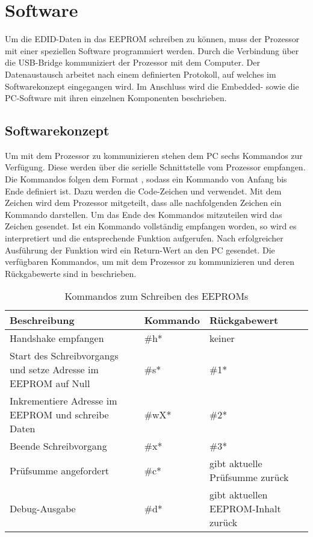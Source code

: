 \section{Software}
\label{sec:TeilB_Software}
Um die EDID-Daten in das EEPROM schreiben zu können, muss der Prozessor mit einer speziellen Software programmiert werden. Durch die Verbindung über die USB-Bridge kommuniziert der Prozessor mit dem Computer. Der Datenaustausch arbeitet nach einem definierten Protokoll, auf welches im Softwarekonzept eingegangen wird. Im Anschluss wird die Embedded- sowie die PC-Software mit ihren einzelnen Komponenten beschrieben. 
\subsection{Softwarekonzept}
\label{softwarekonzept}
Um mit dem Prozessor zu kommunizieren stehen dem PC sechs Kommandos zur Verfügung. Diese werden über die serielle Schnittstelle vom Prozessor empfangen. Die Kommandos folgen dem Format , sodass ein Kommando von Anfang bis Ende definiert ist. Dazu werden die Code-Zeichen \code{\#} und \code{\*} verwendet. Mit dem Zeichen \code{\#} wird dem Prozessor mitgeteilt, dass alle nachfolgenden Zeichen ein Kommando darstellen. Um das Ende des Kommandos mitzuteilen wird das Zeichen \code{\*} gesendet. Ist ein Kommando vollständig empfangen worden, so wird es interpretiert und die entsprechende Funktion aufgerufen. Nach erfolgreicher Ausführung der Funktion wird ein Return-Wert an den PC gesendet. Die verfügbaren Kommandos, um mit dem Prozessor zu kommunizieren und deren Rückgabewerte sind in  beschrieben.
\begin{table}[h]
\begin{tabular}{|p{6.5cm}|p{2.5cm}|p{3.5cm}|}\hline
\rowcolor{TableBackgroundColor} 
   \textbf{Beschreibung} & \textbf{Kommando} & \textbf{Rückgabewert}	\\ \hline
	Handshake empfangen & \#h* & keiner \\ \hline    
    Start des Schreibvorgangs und setze Adresse im EEPROM auf Null & \#s* & \#1* \\ \hline
    Inkrementiere Adresse im EEPROM und schreibe Daten& \#wX* & \#2* \\ \hline
    Beende Schreibvorgang & \#x* & \#3* \\ \hline
	Prüfsumme angefordert & \#c* & gibt aktuelle Prüfsumme zurück\\ \hline    
    Debug-Ausgabe & \#d* & gibt aktuellen EEPROM-Inhalt zurück\\ \hline
\end{tabular}
\caption{Kommandos zum Schreiben des EEPROMs}
\label{tab:avr_commands}
\end{table} \\

